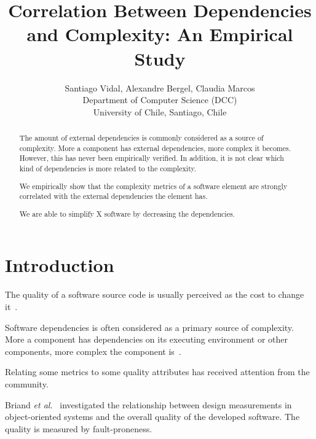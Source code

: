 \documentclass{sig-alternate}
\newcommand{\Title}{Correlation Between Dependencies and Complexity: An Empirical Study}
\newcommand{\TitleShort}{\Title}
\newcommand{\Authors}{Santiago Vidal, Alexandre Bergel, Claudia Marcos}
\newcommand{\AuthorsShort}{S. Vidal, A. Bergel, C. Marcos}
\newcommand{\etal}{\emph{et al.}\xspace}
\newcommand{\seclabel}[1]{\label{sec:#1}}
\begin{document}
\title{\Title}

\author{\Authors\\[3mm]
Department of Computer Science (DCC)\\ University of Chile, Santiago, Chile\\[1 ex]
} 

\maketitle


\begin{abstract}
The amount of external dependencies is commonly considered as a source of complexity.  More a component has external dependencies, more complex it becomes. However, this has never been empirically verified. In addition, it is not clear which kind of dependencies is more related to the complexity.



We empirically show that the complexity metrics of a software element are strongly correlated with the external dependencies the element has.

We are able to simplify X software by decreasing the dependencies.

\end{abstract}

\section{Introduction}\seclabel{introduction}

The quality of a software source code is usually perceived as the cost to change it~\cite{}.

Software dependencies is often considered as a primary source of complexity. More a component has dependencies on its executing environment or other components, more complex the component is~\cite{Sang05a}. 

Relating some metrics to some quality attributes has received attention from the community.

Briand \etal~\cite{Bria00a} investigated the relationship between design measurements in object-oriented systems and the overall quality of the developed software. The quality is measured by fault-proneness. 
\end{document}
